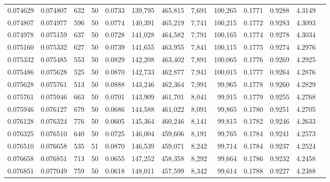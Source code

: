 \begin{tabular}{rrrrrrrrrrrrr}
0.074629 & 0.074807 &   632 &  50 &                                     0.0733 & 139,795 & 465,815 &   7,691 & 100,265 & 0.1771 & 0.9288 & 4.3149 \\
0.074807 & 0.074977 &   596 &  50 &                                     0.0774 & 140,391 & 465,219 &   7,741 & 100,215 & 0.1772 & 0.9283 & 4.3093 \\
0.074978 & 0.075159 &   637 &  50 &                                     0.0728 & 141,028 & 464,582 &   7,791 & 100,165 & 0.1774 & 0.9278 & 4.3034 \\
0.075160 & 0.075332 &   627 &  50 &                                     0.0739 & 141,655 & 463,955 &   7,841 & 100,115 & 0.1775 & 0.9274 & 4.2976 \\
0.075332 & 0.075485 &   553 &  50 &                                     0.0829 & 142,208 & 463,402 &   7,891 & 100,065 & 0.1776 & 0.9269 & 4.2925 \\
0.075486 & 0.075628 &   525 &  50 &                                     0.0870 & 142,733 & 462,877 &   7,941 & 100,015 & 0.1777 & 0.9264 & 4.2876 \\
0.075628 & 0.075761 &   513 &  50 &                                     0.0888 & 143,246 & 462,364 &   7,991 &  99,965 & 0.1778 & 0.9260 & 4.2829 \\
0.075761 & 0.075946 &   663 &  50 &                                     0.0701 & 143,909 & 461,701 &   8,041 &  99,915 & 0.1779 & 0.9255 & 4.2768 \\
0.075946 & 0.076127 &   679 &  50 &                                     0.0686 & 144,588 & 461,022 &   8,091 &  99,865 & 0.1780 & 0.9251 & 4.2705 \\
0.076128 & 0.076324 &   776 &  50 &                                     0.0605 & 145,364 & 460,246 &   8,141 &  99,815 & 0.1782 & 0.9246 & 4.2633 \\
0.076325 & 0.076510 &   640 &  50 &                                     0.0725 & 146,004 & 459,606 &   8,191 &  99,765 & 0.1784 & 0.9241 & 4.2573 \\
0.076510 & 0.076658 &   535 &  51 &                                     0.0870 & 146,539 & 459,071 &   8,242 &  99,714 & 0.1784 & 0.9237 & 4.2524 \\
0.076658 & 0.076851 &   713 &  50 &                                     0.0655 & 147,252 & 458,358 &   8,292 &  99,664 & 0.1786 & 0.9232 & 4.2458 \\
0.076851 & 0.077049 &   759 &  50 &                                     0.0618 & 148,011 & 457,599 &   8,342 &  99,614 & 0.1788 & 0.9227 & 4.2388 \\

\end{tabular}
